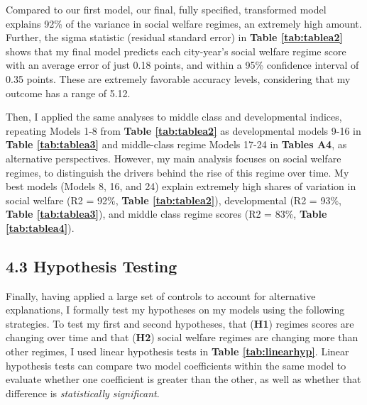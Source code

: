 \documentclass[preprint, 3p,
authoryear]{elsarticle} %
\begin{document}
Compared to our first model, our final, fully specified, transformed
model explains 92\% of the variance in social welfare regimes, an
extremely high amount. Further, the sigma statistic (residual standard
error) in \textbf{Table \ref{tab:tablea2}} shows that my final model
predicts each city-year's social welfare regime score with an average
error of just 0.18 points, and within a 95\% confidence interval of 0.35
points. These are extremely favorable accuracy levels, considering that
my outcome has a range of 5.12.

Then, I applied the same analyses to middle class and developmental
indices, repeating Models 1-8 from \textbf{Table \ref{tab:tablea2}} as
developmental models 9-16 in \textbf{Table \ref{tab:tablea3}} and
middle-class regime Models 17-24 in \textbf{Tables A4}, as alternative
perspectives. However, my main analysis focuses on social welfare
regimes, to distinguish the drivers behind the rise of this regime over
time. My best models (Models 8, 16, and 24) explain extremely high
shares of variation in social welfare (R2 = 92\%,
\textbf{Table \ref{tab:tablea2}}), developmental (R2 = 93\%,
\textbf{Table \ref{tab:tablea3}}), and middle class regime scores (R2 =
83\%, \textbf{Table \ref{tab:tablea4}}).

\hypertarget{hypothesis-testing}{%
\subsection{4.3 Hypothesis Testing}\label{hypothesis-testing}}

Finally, having applied a large set of controls to account for
alternative explanations, I formally test my hypotheses on my models
using the following strategies. To test my first and second hypotheses,
that (\textbf{H1}) regimes scores are changing over time and that
(\textbf{H2}) social welfare regimes are changing more than other
regimes, I used linear hypothesis tests in
\textbf{Table  \ref{tab:linearhyp}}. Linear hypothesis tests
\citep{hothorn_et_al_2008, bretz_et_al_2016} can compare two model
coefficients within the same model to evaluate whether one coefficient
is greater than the other, as well as whether that difference is
\emph{statistically significant}.
\end{document}
